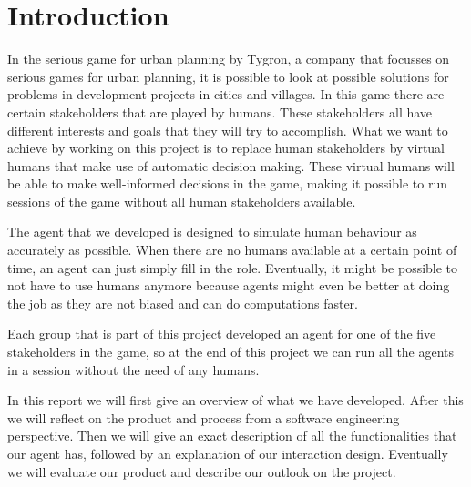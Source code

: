 \chapter*{Introduction}
In the serious game for urban planning by Tygron, a company that focusses on serious games for urban planning, it is possible to look at possible solutions for problems in development projects in cities and villages. In this game there are certain stakeholders that are played by humans. These stakeholders all have different interests and goals that they will try to accomplish. What we want to achieve by working on this project is to replace human stakeholders by virtual humans that make use of automatic decision making. These virtual humans will be able to make well-informed decisions in the game, making it possible to run sessions of the game without all human stakeholders available.

The agent that we developed is designed to simulate human behaviour as accurately as possible. When there are no humans available at a certain point of time, an agent can just simply fill in the role. Eventually, it might be possible to not have to use humans anymore because agents might even be better at doing the job as they are not biased and can do computations faster.

Each group that is part of this project developed an agent for one of the five stakeholders in the game, so at the end of this project we can run all the agents in a session without the need of any humans.

In this report we will first give an overview of what we have developed. After this we will reflect on the product and process from a software engineering perspective. Then we will give an exact description of all the functionalities that our agent has, followed by an explanation of our interaction design. Eventually we will evaluate our product and describe our outlook on the project.
\newpage
